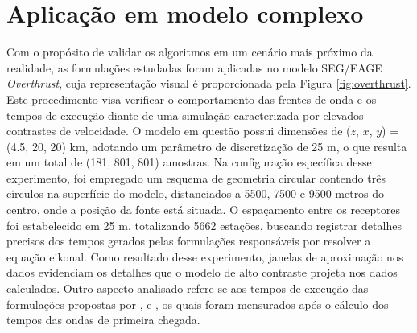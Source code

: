 \section{Aplicação em modelo complexo}

Com o propósito de validar os algoritmos em um cenário mais próximo da realidade, as formulações estudadas foram aplicadas no modelo SEG/EAGE \textit{Overthrust}, cuja representação visual é proporcionada pela Figura \ref{fig:overthrust}. Este procedimento visa verificar o comportamento das frentes de onda e os tempos de execução diante de uma simulação caracterizada por elevados contrastes de velocidade. O modelo em questão possui dimensões de ($z$, $x$, $y$) = (4.5, 20, 20) km, adotando um parâmetro de discretização de 25 m, o que resulta em um total de (181, 801, 801) amostras. Na configuração específica desse experimento, foi empregado um esquema de geometria circular contendo três círculos na superfície do modelo, distanciados a 5500, 7500 e 9500 metros do centro, onde a posição da fonte está situada. O espaçamento entre os receptores foi estabelecido em 25 m, totalizando 5662 estações, buscando registrar detalhes precisos dos tempos gerados pelas formulações responsáveis por resolver a equação eikonal. Como resultado desse experimento, janelas de aproximação nos dados evidenciam os detalhes que o modelo de alto contraste projeta nos dados calculados. Outro aspecto analisado refere-se aos tempos de execução das formulações propostas por ,  e , os quais foram mensurados após o cálculo dos tempos das ondas de primeira chegada. 


